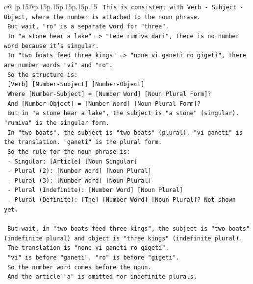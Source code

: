 \documentclass{article}
\begin{document}
{\begin{supertabular}{c@{$\;$}|p{.15\linewidth}@{}p{.15\linewidth}p{.15\linewidth}p{.15\linewidth}p{.15\linewidth}p{.15\linewidth}}
{{{\texttt{   This is consistent with Verb {-} Subject {-} Object, where the number is attached to the noun phrase.} \\
\texttt{   But wait, "ro" is a separate word for "three".} \\
\texttt{   In "a stone hear a lake" => "tede rumiva dari", there is no number word because it's singular.} \\
\texttt{   In "two boats feed three kings" => "none vi ganeti ro gigeti", there are number words "vi" and "ro".} \\
\texttt{   So the structure is:} \\
\texttt{   {[}Verb{]} {[}Number{-}Subject{]} {[}Number{-}Object{]}} \\
\texttt{   Where {[}Number{-}Subject{]} = {[}Number Word{]} {[}Noun Plural Form{]}?} \\
\texttt{   And {[}Number{-}Object{]} = {[}Number Word{]} {[}Noun Plural Form{]}?} \\
\texttt{   But in "a stone hear a lake", the subject is "a stone" (singular). "rumiva" is the singular form.} \\
\texttt{   In "two boats", the subject is "two boats" (plural). "vi ganeti" is the translation. "ganeti" is the plural form.} \\
\texttt{   So the rule for the noun phrase is:} \\
\texttt{   {-} Singular: {[}Article{]} {[}Noun Singular{]}} \\
\texttt{   {-} Plural (2): {[}Number Word{]} {[}Noun Plural{]}} \\
\texttt{   {-} Plural (3): {[}Number Word{]} {[}Noun Plural{]}} \\
\texttt{   {-} Plural (Indefinite): {[}Number Word{]} {[}Noun Plural{]}} \\
\texttt{   {-} Plural (Definite): {[}The{]} {[}Number Word{]} {[}Noun Plural{]}? Not shown yet.} \\
\\ 
\texttt{   But wait, in "two boats feed three kings", the subject is "two boats" (indefinite plural) and object is "three kings" (indefinite plural).} \\
\texttt{   The translation is "none vi ganeti ro gigeti".} \\
\texttt{   "vi" is before "ganeti". "ro" is before "gigeti".} \\
\texttt{   So the number word comes before the noun.} \\
\texttt{   And the article "a" is omitted for indefinite plurals.} \\
}}}
\end{supertabular}}
\end{document}
